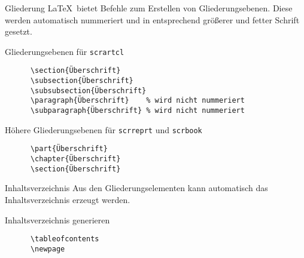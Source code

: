 \begin{frame}[fragile]{Gliederung}
  \LaTeX\ bietet Befehle zum Erstellen von Gliederungsebenen.
  Diese werden automatisch nummeriert und in entsprechend größerer und fetter Schrift gesetzt.

  \begin{block}{Gliederungsebenen für \texttt{scrartcl}}
    \begin{verbatim}
      \section{Überschrift}
      \subsection{Überschrift}
      \subsubsection{Überschrift}
      \paragraph{Überschrift}    % wird nicht nummeriert
      \subparagraph{Überschrift} % wird nicht nummeriert
    \end{verbatim}
  \end{block}
  \begin{block}{Höhere Gliederungsebenen für \texttt{scrreprt} und \texttt{scrbook}}
    \begin{verbatim}
      \part{Überschrift}
      \chapter{Überschrift}
      \section{Überschrift}
    \end{verbatim}
  \end{block}
\end{frame}

\begin{frame}[fragile]{Inhaltsverzeichnis}
  Aus den Gliederungselementen kann automatisch das Inhaltsverzeichnis erzeugt werden.
  \begin{block}{Inhaltsverzeichnis generieren}
    \begin{verbatim}
      \tableofcontents
      \newpage
    \end{verbatim}
  \end{block}
\end{frame}
